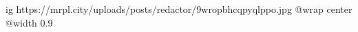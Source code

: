  
 
 
 
 

\ifcmt
  ig https://mrpl.city/uploads/posts/redactor/9wropbhcqpyqlppo.jpg
  @wrap center
  @width 0.9
\fi
